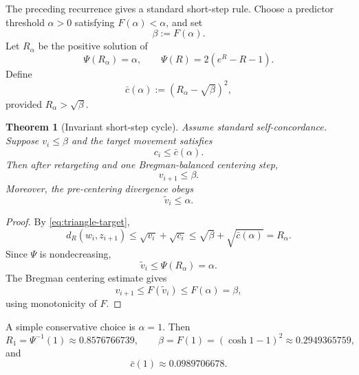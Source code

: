 \documentclass[11pt]{article}
\newtheorem{theorem}{Theorem}[section]
\newcommand{\distR}{d_R}
\begin{document}
The preceding recurrence gives a standard short-step rule.  Choose a predictor threshold $\alpha>0$ satisfying $F(\alpha)<\alpha$, and set
\begin{equation}
  \beta:=F(\alpha).                                   \label{eq:beta-alpha}
\end{equation}
Let $R_\alpha$ be the positive solution of
\begin{equation}
  \Psi(R_\alpha)=\alpha,
  \qquad
  \Psi(R)=2(e^R-R-1).                                  \label{eq:R-alpha}
\end{equation}
Define
\begin{equation}
  \bar c(\alpha):=\left(R_\alpha-\sqrt{\beta}\right)^2, \label{eq:cbar-alpha}
\end{equation}
provided $R_\alpha>\sqrt\beta$.

\begin{theorem}[Invariant short-step cycle]
Assume standard self-concordance.  Suppose $v_i\le\beta$ and the target movement satisfies
\begin{equation}
  c_i\le \bar c(\alpha).
\end{equation}
Then after retargeting and one Bregman-balanced centering step,
\begin{equation}
  v_{i+1}\le\beta.
\end{equation}
Moreover, the pre-centering divergence obeys
\begin{equation}
  \widetilde v_i\le\alpha.
\end{equation}
\end{theorem}

\begin{proof}
By \eqref{eq:triangle-target},
\[
  \distR(w_i,z_{i+1})\le\sqrt{v_i}+\sqrt{c_i}
  \le\sqrt\beta+\sqrt{\bar c(\alpha)}=R_\alpha.
\]
Since $\Psi$ is nondecreasing,
\[
  \widetilde v_i\le\Psi(R_\alpha)=\alpha.
\]
The Bregman centering estimate gives
\[
  v_{i+1}\le F(\widetilde v_i)\le F(\alpha)=\beta,
\]
using monotonicity of $F$.
\end{proof}

A simple conservative choice is $\alpha=1$.  Then
\[
  R_1=\Psi^{-1}(1)\approx 0.8576766739,
  \qquad
  \beta=F(1)=(\cosh1-1)^2\approx 0.2949365759,
\]
and
\begin{equation}
  \bar c(1)\approx 0.0989706678.                         \label{eq:cbar-alpha-one}
\end{equation}
\end{document}
